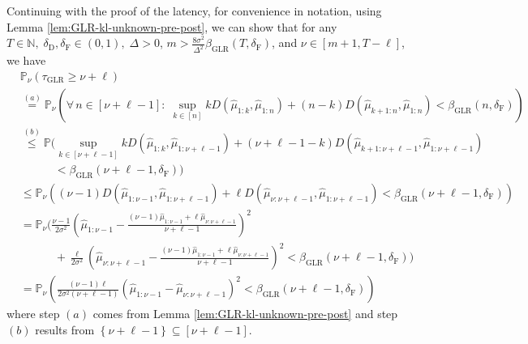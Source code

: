 \documentclass[12pt]{interact}
\newcommand{\lp}{\left(}
\newcommand{\rp}{\right)}
\newcommand{\lb}{\left[}
\newcommand{\rb}{\right]}
\newcommand{\lbp}{\left\{}
\newcommand{\rbp}{\right\}}
\newcommand{\mrm}{\mathrm}
\newcommand{\mbb}{\mathbb}
\renewcommand{\Pr}{\mathbb{P}}
\theoremstyle{plain}
\begin{document}
Continuing with the proof of the latency, for convenience in notation,  using Lemma \ref{lem:GLR-kl-unknown-pre-post}, we can show that for any $T\in\mbb{N},\;\delta_{\mrm{D}},\delta_{\mrm{F}}\in\lp0,1\rp,\;\Delta>0$, $m>\frac{8\sigma^{2}}{\Delta^{2}}\beta_{\mrm{GLR}}\lp T,\delta_{\mrm{F}}\rp$, and $\nu\in\lb m+1,T-\ell \rb$, we have
%
\begin{align}\nonumber
    &\Pr_{\nu}\lp \tau_{\mrm{GLR}}\geq\nu+\ell\rp\\\nonumber
    &\overset{(a)}{=}\Pr_{\nu}\lp\forall\,n\in\lb \nu+\ell-1\rb:\;\sup_{k\in \lb n \rb} k D \lp\hat{\mu}_{1:k},\hat{\mu}_{1:n}\rp+\lp n-k\rp D \lp\hat{\mu}_{k+1:n},\hat{\mu}_{1:n}\rp<\beta_{\mrm{GLR}}\lp n,\delta_{\mrm{F}}\rp\rp\\\nonumber
    &\overset{(b)}{\leq}\Pr\Bigg(\sup_{k\in \lb\nu+\ell-1\rb} k D \lp\hat{\mu}_{1:k},\hat{\mu}_{1:\nu+\ell-1}\rp+ \lp\nu+\ell-1-k\rp D \lp\hat{\mu}_{k+1:\nu+\ell-1},\hat{\mu}_{1:\nu+\ell-1}\rp\\\nonumber
    &\quad\quad\quad<\beta_{\mrm{GLR}} \lp \nu+\ell-1,\delta_{\mrm{F}}\rp\Bigg)\\\nonumber
    &\leq \Pr_{\nu}\lp\lp\nu-1\rp D \lp\hat{\mu}_{1:\nu-1},\hat{\mu}_{1:\nu+\ell-1}\rp+\ell D \lp\hat{\mu}_{\nu:\nu+\ell-1},\hat{\mu}_{1:\nu+\ell-1}\rp<\beta_{\mrm{GLR}}\lp\nu+\ell-1,\delta_{\mrm{F}}\rp\rp\\\nonumber
    &=\Pr_{\nu}\Bigg(\frac{\nu-1}{2\sigma^{2}}\lp\hat{\mu}_{1:\nu-1}-\frac{\lp\nu-1\rp\hat{\mu}_{1:\nu-1}+\ell\hat{\mu}_{\nu:\nu+\ell-1}}{\nu+\ell-1}\rp^{2}\\\nonumber
    &\quad\quad\quad+\frac{\ell}{2\sigma^{2}}\lp\hat{\mu}_{\nu:\nu+\ell-1}-\frac{\lp\nu-1\rp\hat{\mu}_{1:\nu-1}+\ell\hat{\mu}_{\nu:\nu+\ell-1}}{\nu+\ell-1}\rp^{2}<\beta_{\mrm{GLR}}\lp\nu+\ell-1,\delta_{\mrm{F}}\rp\Bigg)\\
    &=\Pr_{\nu}\lp\frac{\lp\nu-1\rp \ell}{2\sigma^{2}\lp\nu+\ell-1\rp}\lp\hat{\mu}_{1:\nu-1}-\hat{\mu}_{\nu:\nu+\ell-1}\rp^{2}<\beta_{\mrm{GLR}}\lp\nu+\ell-1,\delta_{\mrm{F}}\rp\rp\label{eq:glr-ld-1}
\end{align}
%
where step $(a)$ comes from Lemma \ref{lem:GLR-kl-unknown-pre-post} and step $(b)$ results from $\lbp\nu+\ell-1\rbp\subseteq\lb \nu+\ell-1\rb$. 
\end{document}
